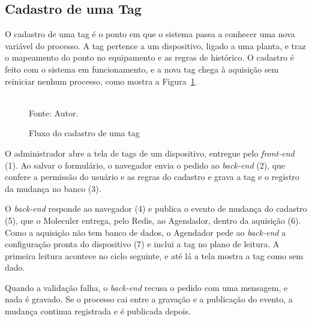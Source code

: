 \subsection{Cadastro de uma Tag}

\par O cadastro de uma tag é o ponto em que o sistema passa a conhecer uma nova variável do processo. A tag pertence a um dispositivo, ligado a uma planta, e traz o mapeamento do ponto no equipamento e as regras de histórico. O cadastro é feito com o sistema em funcionamento, e a nova tag chega à aquisição sem reiniciar nenhum processo, como mostra a Figura~\ref{fig:fx_cadastro_tag}.

\begin{figure}[H]
    \centering
    \caption{Fluxo do cadastro de uma tag}
    \label{fig:fx_cadastro_tag}
    \vspace{0.4cm}
    \vspace{0.2cm} \\
    Fonte: Autor.
\end{figure}

\par O administrador abre a tela de tags de um dispositivo, entregue pelo \emph{front-end} (1). Ao salvar o formulário, o navegador envia o pedido ao \emph{back-end} (2), que confere a permissão do usuário e as regras do cadastro e grava a tag e o registro da mudança no banco (3).

\par O \emph{back-end} responde ao navegador (4) e publica o evento de mudança do cadastro (5), que o Moleculer entrega, pelo Redis, ao Agendador, dentro da aquisição (6). Como a aquisição não tem banco de dados, o Agendador pede ao \emph{back-end} a configuração pronta do dispositivo (7) e inclui a tag no plano de leitura. A primeira leitura acontece no ciclo seguinte, e até lá a tela mostra a tag como sem dado.

\par Quando a validação falha, o \emph{back-end} recusa o pedido com uma mensagem, e nada é gravado. Se o processo cai entre a gravação e a publicação do evento, a mudança continua registrada e é publicada depois.

